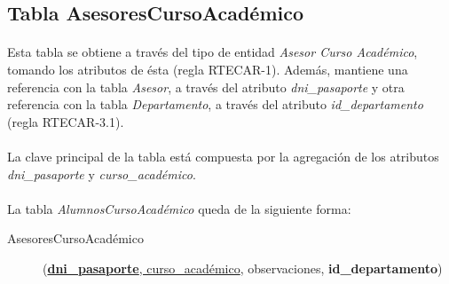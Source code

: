    \subsection{Tabla AsesoresCursoAcadémico}

      \paragraph{}Esta tabla se obtiene a través del tipo de entidad
      \textit{Asesor Curso Académico}, tomando los atributos de ésta (regla
      RTECAR-1). Además, mantiene una referencia con la tabla \textit{Asesor}, a
      través del atributo \textit{dni\_pasaporte} y otra referencia con la tabla
      \textit{Departamento}, a través del atributo \textit{id\_departamento}
      (regla RTECAR-3.1).

      \paragraph{}La clave principal de la tabla está compuesta por la
      agregación de los atributos \textit{dni\_pasaporte} y
      \textit{curso\_académico}.

      \paragraph{}La tabla \textit{AlumnosCursoAcadémico} queda de la siguiente
      forma:

      \begin{description}
         \item[AsesoresCursoAcadémico] \begin{flushleft}(\underline{\textbf{dni\_pasaporte},
         curso\_académico}, observaciones, \textbf{id\_departamento})\end{flushleft}
      \end{description}
